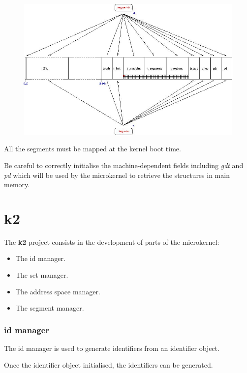 \begin{figure}[h]
\centerline{\includegraphics[scale=0.5]{figures/k1-memory-layout.jpg}}
\end{figure}

All the segments must be mapped at the kernel boot time.

Be careful to correctly initialise the machine-dependent fields
including \textit{gdt} and \textit{pd} which will be used by the microkernel
to retrieve the structures in main memory.

%
%

\section{k2}

The \textbf{k2} project consists in the development of parts of
the microkernel:

\begin{itemize}
  \item
    The id manager.
  \item
    The set manager.
  \item
    The address space manager.
  \item
    The segment manager.
\end{itemize}

%
%

\subsubsection{id manager}

The id manager is used to generate identifiers from an identifier object.

Once the identifier object initialised, the identifiers can be generated.

